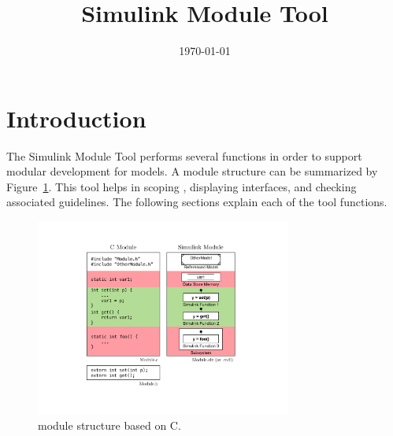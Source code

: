\documentclass{article}
\makeatletter
\newcommand{\ToolName}{Simulink Module Tool\@\xspace}
\makeatother
\begin{document}
\title{\ToolName}
\date{\monthyeardate\today}
\maketitle
\vfill


\newpage


\tableofcontents
\newpage

\section{Introduction}

The \ToolName performs several functions in order to support modular development for \Simulink models. A \Simulink module structure can be summarized by Figure~\ref{FIG:module}. This tool helps in scoping , displaying interfaces, and checking associated guidelines. The following sections explain each of the tool functions.

\begin{figure}
	\centering
	\includegraphics[width=0.75\textwidth]{../figs/Module}
	\caption{\Simulink module structure based on C.}
	\label{FIG:module}
\end{figure}
\end{document}
